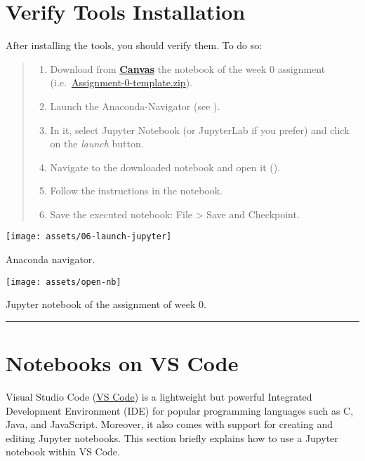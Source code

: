 \documentclass{latex-template/tufte-handout}
\begin{document}
\section{Verify Tools Installation}\label{verify-tools-installation}

After installing the tools, you should verify them. To do so:

\begin{quote}
\begin{enumerate}
\def\labelenumi{\arabic{enumi}.}
\item Download from \textbf{\href{https://canvas.vu.nl/courses/62909}{Canvas}} the notebook of the week 0 assignment (i.e.~\href{https://canvas.vu.nl/courses/62909/assignments/220747}{Assignment-0-template.zip}).
\item Launch the Anaconda-Navigator (see ).
\item In it, select Jupyter Notebook (or JupyterLab if you prefer) and click
  on the \emph{launch} button.
\item Navigate to the downloaded notebook and open it ().
\item Follow the instructions in the notebook.
\item Save the executed notebook: File \textgreater{} Save and Checkpoint.
\end{enumerate}

\end{quote}

\begin{marginfigure}%
  \texttt{[image: assets/06-launch-jupyter]}
  \caption{Anaconda navigator.}
  \label{fig:anaconda-navigator}
\end{marginfigure}



\begin{marginfigure}%
  \texttt{[image: assets/open-nb]}
  \caption{Jupyter notebook of the assignment of week 0.}
  \label{fig:week-0}
\end{marginfigure}

\begin{center}\rule{\linewidth}{0.5pt}\end{center}


\section{Notebooks on VS Code}
Visual Studio Code (\href{https://code.visualstudio.com/}{VS Code}) is a lightweight but powerful Integrated Development Environment (IDE) for popular programming languages such as C, Java, and JavaScript. 
Moreover, it also comes with support for creating and editing Jupyter notebooks.
This section briefly explains how to use a Jupyter notebook within VS Code.
\end{document}

